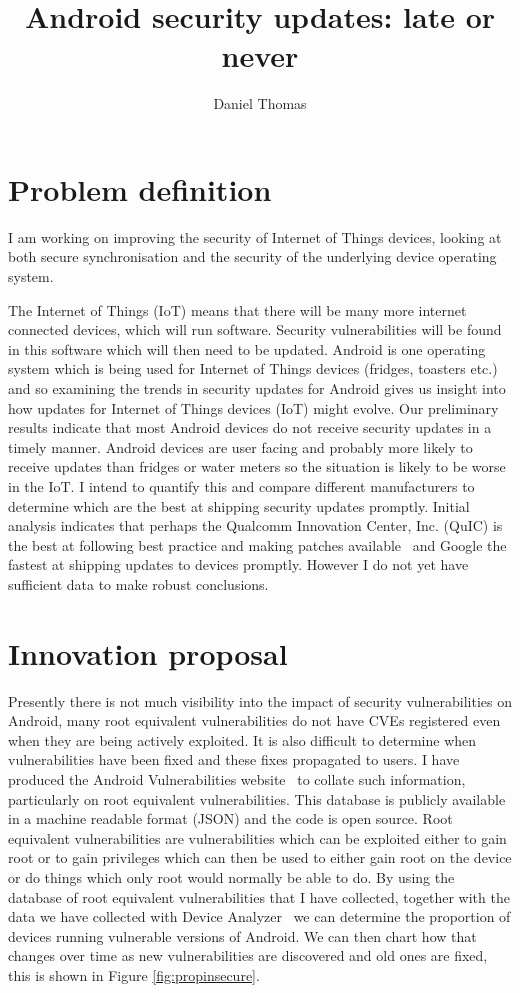 \documentclass[a4paper,twocolumn]{article}
\author{Daniel Thomas}
\title{Android security updates: late or never}
\date{}%
\begin{document}
\maketitle

\section*{Problem definition}
I am working on improving the security of Internet of Things devices, looking at both secure synchronisation and the security of the underlying device operating system.

The Internet of Things (IoT) means that there will be many more internet connected devices, which will run software.
Security vulnerabilities will be found in this software which will then need to be updated.
Android is one operating system which is being used for Internet of Things devices (fridges, toasters etc.) and so examining the trends in security updates for Android gives us insight into how updates for Internet of Things devices (IoT) might evolve.
Our preliminary results indicate that most Android devices do not receive security updates in a timely manner.
Android devices are user facing and probably more likely to receive updates than fridges or water meters so the situation is likely to be worse in the IoT.
I intend to quantify this and compare different manufacturers to determine which are the best at shipping security updates promptly.
Initial analysis indicates that perhaps the Qualcomm Innovation Center, Inc. (QuIC) is the best at following best practice and making patches available~\cite{codeaurora-security-advisories} and Google the fastest at shipping updates to devices promptly.
However I do not yet have sufficient data to make robust conclusions.


\section*{Innovation proposal}
Presently there is not much visibility into the impact of security vulnerabilities on Android, many root equivalent vulnerabilities do not have CVEs registered even when they are being actively exploited.
It is also difficult to determine when vulnerabilities have been fixed and these fixes propagated to users.
I have produced the Android Vulnerabilities website~\cite{androidvulnerabilities.org} to collate such information, particularly on root equivalent vulnerabilities.
This database is publicly available in a machine readable format (JSON) and the code is open source.
Root equivalent vulnerabilities are vulnerabilities which can be exploited either to gain root or to gain privileges which can then be used to either gain root on the device or do things which only root would normally be able to do.
By using the database of root equivalent vulnerabilities that I have collected, together with the data we have collected with Device Analyzer~\cite{Wagner2013} we can determine the proportion of devices running vulnerable versions of Android.
We can then chart how that changes over time as new vulnerabilities are discovered and old ones are fixed, this is shown in Figure \ref{fig:propinsecure}.
\end{document}
